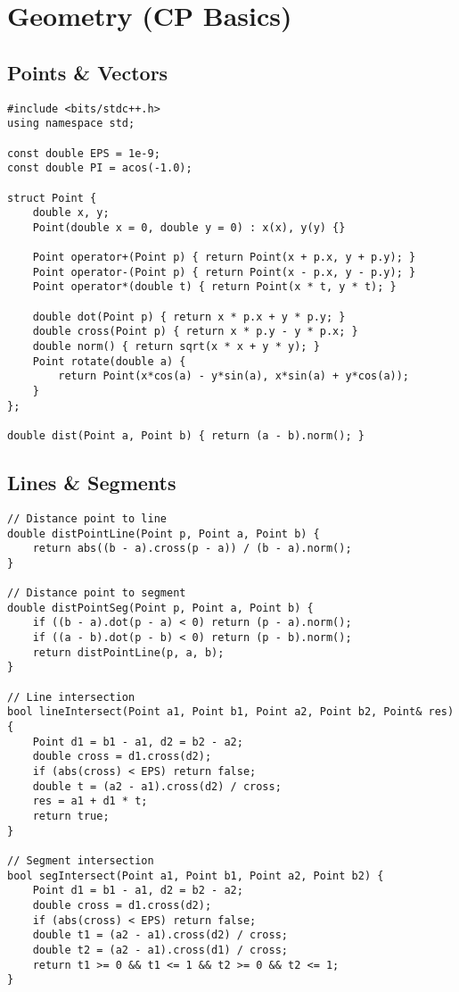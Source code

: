 \documentclass[11pt,a4paper]{article}
\begin{document}
\newpage
\section{Geometry (CP Basics)}

\subsection{Points \& Vectors}
\begin{lstlisting}[caption={Point and Vector Structure}]
#include <bits/stdc++.h>
using namespace std;

const double EPS = 1e-9;
const double PI = acos(-1.0);

struct Point {
    double x, y;
    Point(double x = 0, double y = 0) : x(x), y(y) {}
    
    Point operator+(Point p) { return Point(x + p.x, y + p.y); }
    Point operator-(Point p) { return Point(x - p.x, y - p.y); }
    Point operator*(double t) { return Point(x * t, y * t); }
    
    double dot(Point p) { return x * p.x + y * p.y; }
    double cross(Point p) { return x * p.y - y * p.x; }
    double norm() { return sqrt(x * x + y * y); }
    Point rotate(double a) { 
        return Point(x*cos(a) - y*sin(a), x*sin(a) + y*cos(a));
    }
};

double dist(Point a, Point b) { return (a - b).norm(); }
\end{lstlisting}

\newpage

\subsection{Lines \& Segments}
\begin{lstlisting}[caption={Line and Segment Operations}]
// Distance point to line
double distPointLine(Point p, Point a, Point b) {
    return abs((b - a).cross(p - a)) / (b - a).norm();
}

// Distance point to segment
double distPointSeg(Point p, Point a, Point b) {
    if ((b - a).dot(p - a) < 0) return (p - a).norm();
    if ((a - b).dot(p - b) < 0) return (p - b).norm();
    return distPointLine(p, a, b);
}

// Line intersection
bool lineIntersect(Point a1, Point b1, Point a2, Point b2, Point& res) {
    Point d1 = b1 - a1, d2 = b2 - a2;
    double cross = d1.cross(d2);
    if (abs(cross) < EPS) return false;
    double t = (a2 - a1).cross(d2) / cross;
    res = a1 + d1 * t;
    return true;
}

// Segment intersection
bool segIntersect(Point a1, Point b1, Point a2, Point b2) {
    Point d1 = b1 - a1, d2 = b2 - a2;
    double cross = d1.cross(d2);
    if (abs(cross) < EPS) return false;
    double t1 = (a2 - a1).cross(d2) / cross;
    double t2 = (a2 - a1).cross(d1) / cross;
    return t1 >= 0 && t1 <= 1 && t2 >= 0 && t2 <= 1;
}
\end{lstlisting}
\end{document}
